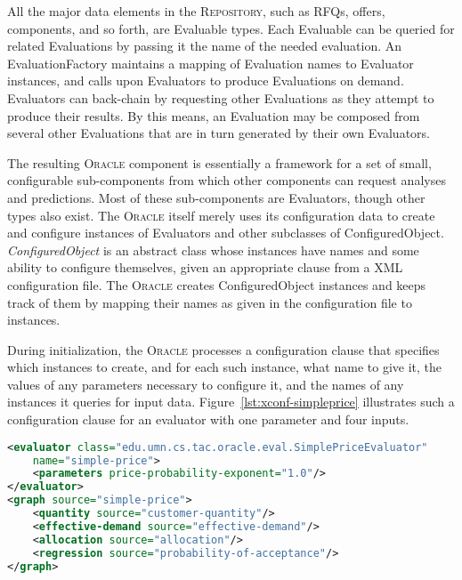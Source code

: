 \documentclass{elsart}
\begin{document}
All the major data elements in the \textsc{Repository}, such as RFQs,
offers, components, and so forth, are Evaluable types.  Each Evaluable can
be queried for related Evaluations by passing it the name of the needed
evaluation.  An EvaluationFactory maintains a mapping of Evaluation
names to Evaluator instances, and calls upon Evaluators to produce
Evaluations on demand.  Evaluators can back-chain by requesting other
Evaluations as they attempt to produce their results.  By this means,
an Evaluation may be composed from several other Evaluations that are
in turn generated by their own Evaluators.

The resulting \textsc{Oracle} component is essentially a framework for
a set of small, configurable sub-components from which other components
can request analyses and predictions.  Most of these sub-components
are Evaluators, though other types also exist.  The \textsc{Oracle}
itself merely uses its configuration data to create and configure
instances of Evaluators and other subclasses of ConfiguredObject.
\emph{ConfiguredObject} is an abstract class whose instances have names
and some ability to configure themselves, given an appropriate clause from
a XML configuration file.  The \textsc{Oracle} creates ConfiguredObject
instances and keeps track of them by mapping their names as given in
the configuration file to instances.


During initialization, the \textsc{Oracle} processes a configuration
clause that specifies which instances to create, and for each such
instance, what name to give it, the values of any parameters necessary to
configure it, and the names of any instances it queries for input data.
Figure~\ref{lst:xconf-simpleprice} illustrates such a configuration
clause for an evaluator with one parameter and four inputs.

\begin{lstlisting}[language={XML},frame={single},belowcaptionskip=0.4cm,
label={lst:xconf-simpleprice},caption={Configuration clause for a price
evaluator that uses one parameter and several inputs}]
<evaluator class="edu.umn.cs.tac.oracle.eval.SimplePriceEvaluator"
    name="simple-price">
    <parameters price-probability-exponent="1.0"/>
</evaluator>
<graph source="simple-price">
    <quantity source="customer-quantity"/>
    <effective-demand source="effective-demand"/>
    <allocation source="allocation"/>
    <regression source="probability-of-acceptance"/>
</graph>
\end{lstlisting}
\end{document}
